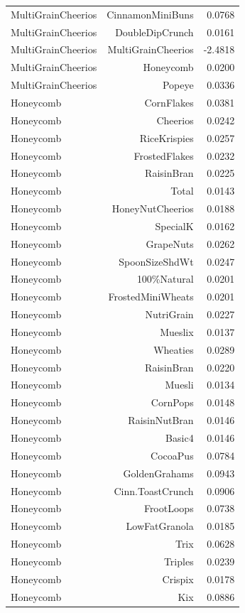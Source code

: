 \begin{longtable}{@{}lrr@{}}
MultiGrainCheerios & CinnamonMiniBuns & 0.0768 \\
MultiGrainCheerios & DoubleDipCrunch & 0.0161 \\
MultiGrainCheerios & MultiGrainCheerios & -2.4818 \\
MultiGrainCheerios & Honeycomb & 0.0200 \\
MultiGrainCheerios & Popeye & 0.0336 \\
Honeycomb & CornFlakes & 0.0381 \\
Honeycomb & Cheerios & 0.0242 \\
Honeycomb & RiceKrispies & 0.0257 \\
Honeycomb & FrostedFlakes & 0.0232 \\
Honeycomb & RaisinBran & 0.0225 \\
Honeycomb & Total & 0.0143 \\
Honeycomb & HoneyNutCheerios & 0.0188 \\
Honeycomb & SpecialK & 0.0162 \\
Honeycomb & GrapeNuts & 0.0262 \\
Honeycomb & SpoonSizeShdWt & 0.0247 \\
Honeycomb & 100\%Natural & 0.0201 \\
Honeycomb & FrostedMiniWheats & 0.0201 \\
Honeycomb & NutriGrain & 0.0227 \\
Honeycomb & Mueslix & 0.0137 \\
Honeycomb & Wheaties & 0.0289 \\
Honeycomb & RaisinBran & 0.0220 \\
Honeycomb & Muesli & 0.0134 \\
Honeycomb & CornPops & 0.0148 \\
Honeycomb & RaisinNutBran & 0.0146 \\
Honeycomb & Basic4 & 0.0146 \\
Honeycomb & CocoaPus & 0.0784 \\
Honeycomb & GoldenGrahams & 0.0943 \\
Honeycomb & Cinn.ToastCrunch & 0.0906 \\
Honeycomb & FrootLoops & 0.0738 \\
Honeycomb & LowFatGranola & 0.0185 \\
Honeycomb & Trix & 0.0628 \\
Honeycomb & Triples & 0.0239 \\
Honeycomb & Crispix & 0.0178 \\
Honeycomb & Kix & 0.0886 \\

\end{longtable}

